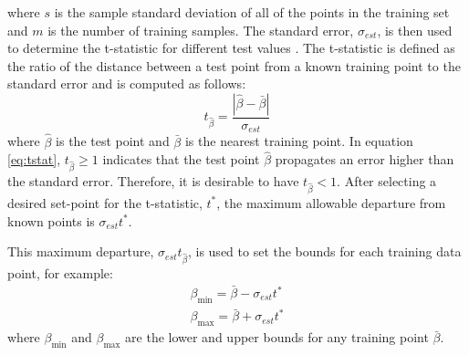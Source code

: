 \documentclass[letterpaper, 10 pt, conference]{ieeeconf}  %
\newcommand\NB[1]{$\spadesuit$\footnote{NB: #1}}
\begin{document}
where $s$ is the sample standard deviation of all of the points in the training set and $m$ is the number of training samples. The standard error, $\sigma_{est}$, is then used to determine the t-statistic for different test values \cite{tstat}. The t-statistic is defined as the ratio of the distance between a test point from a known training point to the standard error and is computed as follows:
\begin{equation} \label{eq:tstat}
t_{\hat{\beta}} = \frac{|\hat{\beta}-\bar{\beta}|}{\sigma_{est}}    
\end{equation}
where $\hat{\beta}$ is the test point and $\bar{\beta}$ is the nearest training point. In equation \eqref{eq:tstat}, $t_{\hat{\beta}} \geq 1$ indicates that the test point $\hat{\beta}$ propagates an error higher than the standard error. Therefore, it is desirable to have $t_{\hat{\beta}} < 1$. 
After selecting a desired set-point for the t-statistic, $t^*$, the maximum allowable departure from known points is $\sigma_{est}t^*$.

This maximum departure, $\sigma_{est}t_{\hat{\beta}}$, is used to set the bounds for each training data point, for example:
\begin{align}
    \beta_{\min} = \bar{\beta} - \sigma_{est}t^* \nonumber \\
    \beta_{\max} = \bar{\beta} + \sigma_{est}t^*
\end{align}
where $\beta_{\min}$ and $\beta_{\max}$ are the lower and upper bounds for any training point $\bar{\beta}$. %
\end{document}
